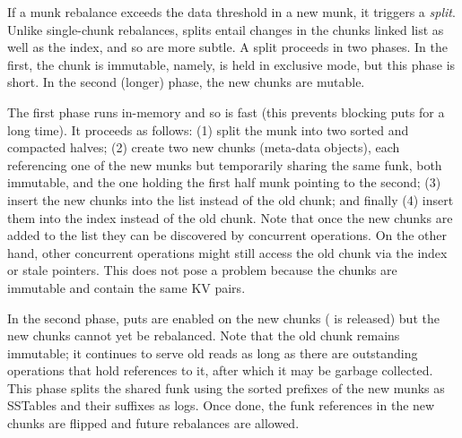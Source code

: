 
If a munk rebalance exceeds the data threshold in a new munk, it triggers a \emph{split}. Unlike 
single-chunk rebalances, splits entail changes in the chunks linked list as well as the index, and so are more subtle. 
A split proceeds in two phases. In the first, the chunk is immutable, namely,   is held in exclusive mode, but this phase is short. In the second (longer) phase, the new chunks are mutable.

The first phase runs in-memory and so is fast (this prevents blocking puts for a long time). 
It proceeds as follows: 
(1) split the munk into two sorted and compacted halves; 
(2) create two new chunks (meta-data objects), each referencing one of the new munks but temporarily sharing the same funk, both immutable, and the one holding the first half munk pointing to the second; 
(3) insert the new chunks into the list instead of the old chunk; and finally  
(4) insert them into the index instead of the old chunk.
Note that once the new chunks are added to the list they can be discovered by concurrent operations.
On the other hand, other concurrent operations might still access the  old chunk via the index or stale pointers. 
This does not pose a problem because the chunks are immutable and contain the same KV pairs. 

In the second phase, puts are enabled on the new chunks ( is released)
but the new chunks cannot yet be rebalanced. 
Note that the old chunk remains immutable; it continues to serve old reads as long as 
there are outstanding operations that hold references to it, after which it may be  garbage collected.
This phase splits the shared funk using the sorted prefixes of the new munks as SSTables and their 
suffixes as  logs. Once done, the funk references in the new chunks are flipped and future rebalances are allowed.



